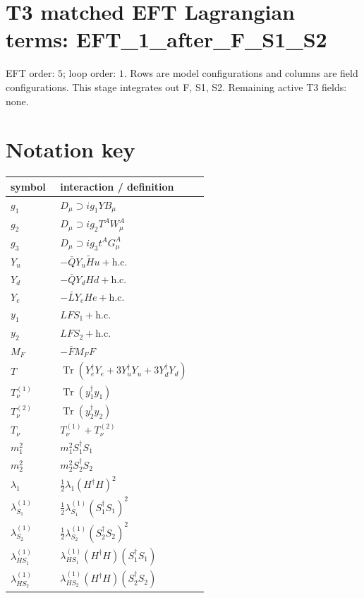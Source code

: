 \documentclass[8pt]{article}
\begin{document}
\begin{landscape}
\section*{T3 matched EFT Lagrangian terms: EFT\_1\_after\_F\_S1\_S2}
EFT order: $5$; loop order: $1$. 
Rows are model configurations and columns are field configurations. This stage integrates out F, S1, S2. Remaining active T3 fields: none.
\section*{Notation key}
\begin{longtable}{@{}p{0.23\linewidth}p{0.69\linewidth}@{}}
\toprule
symbol & interaction / definition \\
\midrule
$g_1$ & $D_\mu\supset i g_1YB_\mu$ \\
$g_2$ & $D_\mu\supset i g_2T^AW_\mu^A$ \\
$g_3$ & $D_\mu\supset i g_3t^AG_\mu^A$ \\
$Y_u$ & $-\bar QY_u\widetilde Hu+\mathrm{h.c.}$ \\
$Y_d$ & $-\bar QY_dHd+\mathrm{h.c.}$ \\
$Y_e$ & $-\bar LY_eHe+\mathrm{h.c.}$ \\
$y_1$ & $LFS_1+\mathrm{h.c.}$ \\
$y_2$ & $LFS_2+\mathrm{h.c.}$ \\
$M_F$ & $-\bar FM_FF$ \\
$T$ & $\operatorname{Tr}(Y_e^\dagger Y_e+3Y_u^\dagger Y_u+3Y_d^\dagger Y_d)$ \\
$T_\nu^{(1)}$ & $\operatorname{Tr}(y_1^\dagger y_1)$ \\
$T_\nu^{(2)}$ & $\operatorname{Tr}(y_2^\dagger y_2)$ \\
$T_\nu$ & $T_\nu^{(1)}+T_\nu^{(2)}$ \\
$m_1^2$ & $m_1^2S_1^\dagger S_1$ \\
$m_2^2$ & $m_2^2S_2^\dagger S_2$ \\
$\lambda_1$ & $\frac12\lambda_1(H^\dagger H)^2$ \\
$\lambda_{S_1}^{(1)}$ & $\frac12\lambda_{S_1}^{(1)}(S_1^\dagger S_1)^2$ \\
$\lambda_{S_2}^{(1)}$ & $\frac12\lambda_{S_2}^{(1)}(S_2^\dagger S_2)^2$ \\
$\lambda_{HS_1}^{(1)}$ & $\lambda_{HS_1}^{(1)}(H^\dagger H)(S_1^\dagger S_1)$ \\
$\lambda_{HS_2}^{(1)}$ & $\lambda_{HS_2}^{(1)}(H^\dagger H)(S_2^\dagger S_2)$ \\

\end{longtable}
\end{landscape}
\end{document}
